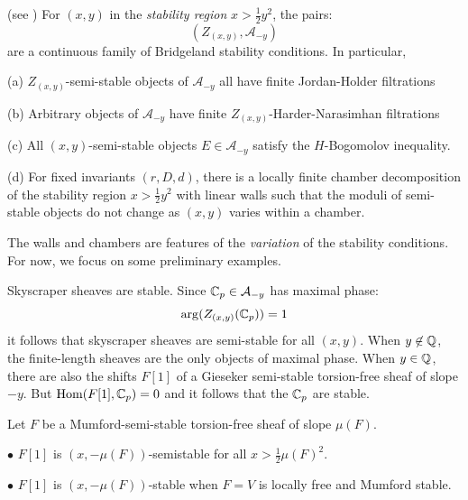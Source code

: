 \documentclass{amsart}
\begin{document}
\medskip

 (see \cite{MS1}) For $(x,y)$ in the {\it stability region} $x > \frac 12y^2$, the pairs:
\[ (Z_{(x,y)}, {\mathcal A}_{-y}) \] 
are a continuous family of Bridgeland stability conditions. In particular, 

\medskip

(a) $Z_{(x,y)}$-semi-stable objects of ${\mathcal A}_{-y}$ all have finite Jordan-Holder filtrations

\medskip

(b) Arbitrary objects of ${\mathcal A}_{-y}$ have finite $Z_{(x,y)}$-Harder-Narasimhan filtrations

\medskip

(c) All $(x,y)$-semi-stable objects $E \in {\mathcal A}_{-y}$ satisfy the $H$-Bogomolov inequality. 

\medskip

(d) For fixed invariants $(r, D, d)$, there is a locally finite chamber decomposition 
of the stability region $x > \frac 12y^2$ with linear walls such
that the moduli of semi-stable objects do not change as $(x,y)$ varies within a chamber.  

\medskip

The walls and chambers are features of the {\it variation} of the stability conditions.
For now, we focus on some preliminary examples. 

\medskip

 Skyscraper sheaves are stable. 
Since ${\mathbb C}_p \in {\mathcal A}_{-y}$ has maximal phase:
\[ \arg(Z_{(x,y)}({\mathbb C}_p)) = 1 \] 
 it follows that skyscraper sheaves are semi-stable for all $(x,y)$. When $y \not\in {\mathbb Q}$, the finite-length sheaves are the only 
objects of maximal phase. When $y \in {\mathbb Q}$, there are also the shifts
$F[1]$
of a Gieseker semi-stable torsion-free sheaf of slope $-y$. But
$\mbox{Hom}(F[1], {\mathbb C}_p) = 0$ and it follows that the ${\mathbb C}_p$ are stable. 

\medskip

 Let $F$ be a Mumford-semi-stable torsion-free sheaf of slope $\mu(F)$. 

\medskip

$\bullet$ $F[1]$ is $(x,-\mu(F))$-semistable for all $x > \frac 12\mu(F)^2$. 

\medskip

$\bullet$ $F[1]$ is $(x,-\mu(F))$-stable when $F = V$ is locally free and Mumford stable. 

\medskip
\end{document}
